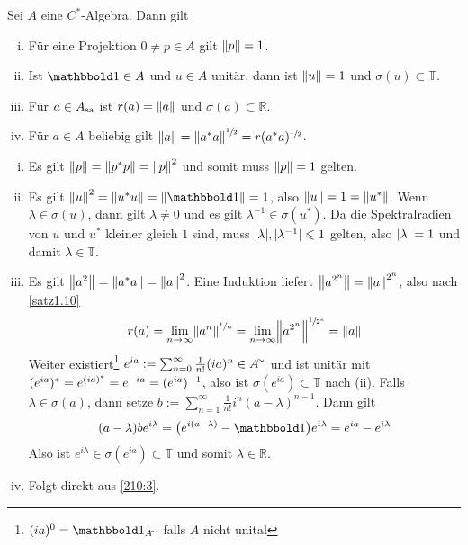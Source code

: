 \begin{proposition}[label=prop:210,{name=[Eigenschaften von Projektionen, unitären und selbstadjungierten Elementen]}]
	Sei $A$ eine $C^*$-Algebra. Dann gilt
	\begin{enumerate}[(i),itemsep=0pt]
		\item Für eine Projektion $0 \neq p  \in A$ gilt $\norm*{p} =1$.
		\item Ist $\ind \in A$ und $u \in A$ unitär, dann ist $\norm*{u}=1$ und $\sigma(u) \subset \mathbb{T}$.
		\item \label{210:3} Für $a \in A_{\sa}$ ist $r(a)= \norm*{a}$ und $\sigma(a) \subset \mathbb{R}$.
		\item Für $a \in A$ beliebig gilt $\norm*{a} = \norm*{a^* a}^{\sfrac{1}{2}}= r(a^* a)^{\sfrac{1}{2}}$.
	\end{enumerate}
\end{proposition}
\begin{beweis}
	\leavevmode
	\begin{enumerate}[(i),itemsep=0pt]
		\item Es gilt $\norm*{p} = \norm*{p^*p}= \norm*{p}^2$ und somit muss $\norm*{p}=1$ gelten.
		\item Es gilt $\norm*{u}^2= \norm*{u^* u}= \norm*{\ind}=1$, also $\norm*{u}=1=\norm*{u^*}$. Wenn $\lambda \in \sigma(u)$, dann gilt $\lambda \neq 0$ und es gilt
		$\lambda^{-1} \in \sigma(u^*)$. Da die Spektralradien von $u$ und $u^*$ kleiner gleich $1$ sind, muss $\abs{\lambda},\abs{\lambda^{-1}}\le 1$ gelten, also $\abs{\lambda}=1$
		und damit $\lambda \in \mathbb{T}$.
		\item Es gilt $\norm*{a^2}= \norm*{a^* a}= \norm*{a}^2$. Eine Induktion liefert $\norm*{a^{2^n}}= \norm*{a}^{2^n}$, also nach \autoref{satz1.10} 
		\[
			r(a) = \lim_{n \to \infty} \norm*{a^n}^{\sfrac{1}{n}} = \lim_{n \to \infty} \norm*{a^{2^n}}^{\sfrac{1}{2^n}} = \norm*{a}
		\]
		Weiter existiert\footnote{$(ia)^0 = \ind_{A^\simm}$ falls $A$ nicht unital} $e^{ia} := \sum_{n=0}^{\infty} \frac{1}{n!}(ia)^n \in A^\simm$ und ist unitär mit 
		\(
			\enbrace{e^{ia}}^* = e^{(ia)^*} = e^{-ia} = \enbrace{e^{ia}}^{-1}
		\), 
		also ist $\sigma(e^{ia}) \subset \mathbb{T}$ nach (ii). Falls $\lambda \in \sigma(a)$, dann setze $b := \sum_{n=1}^{\infty} \frac{1}{n!} i^n (a-\lambda)^{n-1}$. Dann gilt
		\[
			(a-\lambda) b e^{i \lambda} = \enbrace[\big]{e^{i(a-\lambda)}- \ind}e^{i \lambda} = e^{i a} - e^{i \lambda}
		\]
		Also ist $e^{i \lambda} \in \sigma(e^{ia}) \subset \mathbb{T}$ und somit $\lambda \in \mathbb{R}$.
		\item Folgt direkt aus \ref{210:3}. \qedhere
	\end{enumerate}
\end{beweis}

